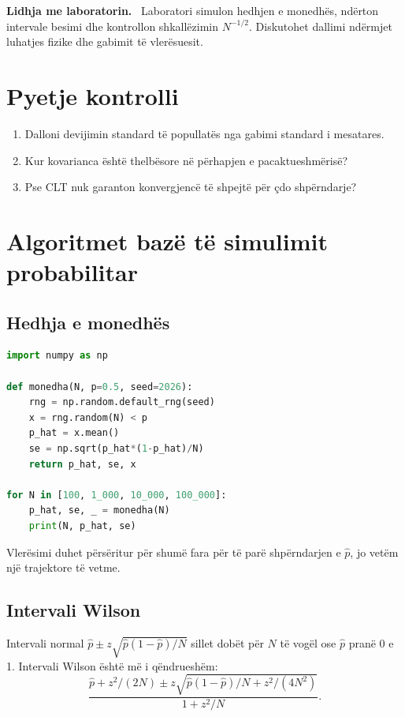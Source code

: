 \documentclass[11pt,oneside,openany]{book}
\newenvironment{lidhje}{\par\medskip\noindent\textbf{Lidhja me laboratorin.}\ }{\par\medskip}
\begin{document}
\begin{lidhje}
Laboratori simulon hedhjen e monedhës, ndërton intervale besimi dhe kontrollon shkallëzimin $N^{-1/2}$. Diskutohet dallimi ndërmjet luhatjes fizike dhe gabimit të vlerësuesit.
\end{lidhje}

\section*{Pyetje kontrolli}
\begin{enumerate}
\item Dalloni devijimin standard të popullatës nga gabimi standard i mesatares.
\item Kur kovarianca është thelbësore në përhapjen e pacaktueshmërisë?
\item Pse CLT nuk garanton konvergjencë të shpejtë për çdo shpërndarje?
\end{enumerate}

\section{Algoritmet bazë të simulimit probabilitar}
\subsection{Hedhja e monedhës}
\begin{lstlisting}[language=Python,caption={Vlerësimi i probabilitetit dhe gabimit standard.}]
import numpy as np

def monedha(N, p=0.5, seed=2026):
    rng = np.random.default_rng(seed)
    x = rng.random(N) < p
    p_hat = x.mean()
    se = np.sqrt(p_hat*(1-p_hat)/N)
    return p_hat, se, x

for N in [100, 1_000, 10_000, 100_000]:
    p_hat, se, _ = monedha(N)
    print(N, p_hat, se)
\end{lstlisting}
Vlerësimi duhet përsëritur për shumë fara për të parë shpërndarjen e $\hat p$, jo vetëm një trajektore të vetme.

\subsection{Intervali Wilson}
Intervali normal $\hat p\pm z\sqrt{\hat p(1-\hat p)/N}$ sillet dobët për $N$ të vogël ose $\hat p$ pranë 0 e 1. Intervali Wilson është më i qëndrueshëm:
\begin{equation}
 \frac{\hat p+z^2/(2N)\pm z\sqrt{\hat p(1-\hat p)/N+z^2/(4N^2)}}{1+z^2/N}.
\end{equation}
\end{document}
